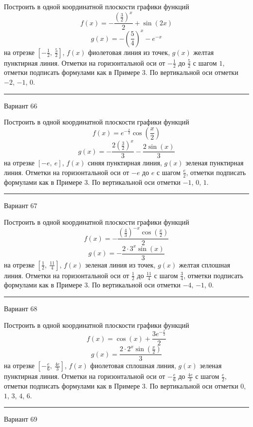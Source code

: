 \documentclass[11pt]{report}
\begin{document}
Построить в одной координатной плоскости графики функций $$f(x) = - \frac{\left(\frac{3}{2}\right)^{x}}{2} + \sin{\left(2 x \right)}$$ $$g(x) = - \left(\frac{5}{4}\right)^{x} - e^{- x}$$ на отрезке $\left[- \frac{1}{2}, \  \frac{5}{2}\right]$, $f(x)$ фиолетовая линия из точек, $g(x)$ желтая пунктирная линия. Отметки на горизонтальной оси от $- \frac{1}{2}$ до $\frac{5}{2}$ с шагом $1$, отметки подписать формулами как в Примере 3. По вертикальной оси отметки $-2$, $-1$, $0$.
\begin{center}
\noindent\rule{8cm}{0.4pt}
\end{center}
Вариант $66$


Построить в одной координатной плоскости графики функций $$f(x) = e^{- \frac{x}{2}} \cos{\left(\frac{x}{2} \right)}$$ $$g(x) = - \frac{2 \left(\frac{3}{2}\right)^{x}}{3} - \frac{2 \sin{\left(x \right)}}{3}$$ на отрезке $\left[- e, \  e\right]$, $f(x)$ синяя пунктирная линия, $g(x)$ зеленая пунктирная линия. Отметки на горизонтальной оси от $- e$ до $e$ с шагом $\frac{e}{2}$, отметки подписать формулами как в Примере 3. По вертикальной оси отметки $-1$, $0$, $1$.
\begin{center}
\noindent\rule{8cm}{0.4pt}
\end{center}
Вариант $67$


Построить в одной координатной плоскости графики функций $$f(x) = - \frac{\left(\frac{4}{3}\right)^{- x} \cos{\left(\frac{x}{2} \right)}}{2}$$ $$g(x) = - \frac{2 \cdot 3^{x} \sin{\left(x \right)}}{3}$$ на отрезке $\left[\frac{1}{2}, \  \frac{11}{4}\right]$, $f(x)$ зеленая линия из точек, $g(x)$ желтая сплошная линия. Отметки на горизонтальной оси от $\frac{1}{2}$ до $\frac{11}{4}$ с шагом $\frac{3}{4}$, отметки подписать формулами как в Примере 3. По вертикальной оси отметки $-4$, $-1$, $0$.
\begin{center}
\noindent\rule{8cm}{0.4pt}
\end{center}
Вариант $68$


Построить в одной координатной плоскости графики функций $$f(x) = \cos{\left(x \right)} + \frac{3 e^{- \frac{x}{2}}}{2}$$ $$g(x) = \frac{2 \cdot 2^{x} \sin{\left(\frac{x}{2} \right)}}{3}$$ на отрезке $\left[- \frac{e}{6}, \  \frac{4 e}{3}\right]$, $f(x)$ фиолетовая сплошная линия, $g(x)$ зеленая пунктирная линия. Отметки на горизонтальной оси от $- \frac{e}{6}$ до $\frac{4 e}{3}$ с шагом $\frac{e}{2}$, отметки подписать формулами как в Примере 3. По вертикальной оси отметки $0$, $1$, $3$, $4$, $6$.
\begin{center}
\noindent\rule{8cm}{0.4pt}
\end{center}
Вариант $69$
\end{document}
